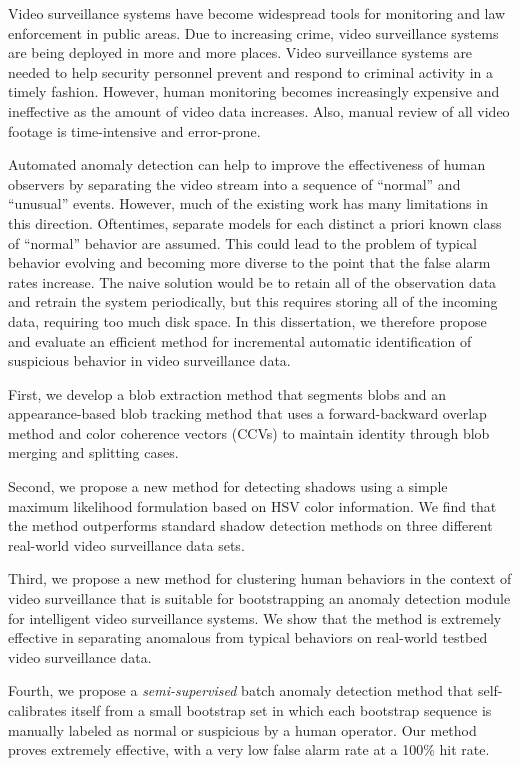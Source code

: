Video surveillance systems have become widespread tools for monitoring
and law enforcement in public areas.  Due to increasing crime, video
surveillance systems are being deployed in more and more places.
Video surveillance systems are needed to help security personnel
prevent and respond to criminal activity in a timely fashion.
However, human monitoring becomes increasingly expensive and
ineffective as the amount of video data increases. Also, manual review of
all video footage is time-intensive and error-prone.

Automated anomaly detection can help to improve the effectiveness of
human observers by separating the video stream into a sequence of
``normal'' and ``unusual'' events. However, much of the existing work
has many limitations in this direction. Oftentimes, separate models
for each distinct a priori known class of ``normal'' behavior are
assumed.  This could lead to the problem of typical behavior evolving
and becoming more diverse to the point that the false alarm rates
increase.  The naive solution would be to retain all of the
observation data and retrain the system periodically, but this
requires storing all of the incoming data, requiring too much disk
space. In this dissertation, we therefore propose and evaluate an
efficient method for incremental automatic identification of
suspicious behavior in video surveillance data.

First, we develop a blob extraction method that segments blobs and an
appearance-based blob tracking method that uses a forward-backward
overlap method and color coherence vectors (CCVs) to maintain identity
through blob merging and splitting cases.

Second, we propose a new method for detecting shadows using a simple
maximum likelihood formulation based on HSV color information. We find
that the method outperforms standard shadow detection methods on three
different real-world video surveillance data sets.

Third, we propose a new method for clustering human behaviors in the
context of video surveillance that is suitable for bootstrapping an
anomaly detection module for intelligent video surveillance
systems. We show that the method is extremely effective in separating
anomalous from typical behaviors on real-world testbed video
surveillance data.

Fourth, we propose a \textit{semi-supervised} batch anomaly
detection method that self-calibrates itself from a small bootstrap
set in which each bootstrap sequence is manually labeled as normal or
suspicious by a human operator. Our method proves extremely effective,
with a very low false alarm rate at a 100\% hit rate.

